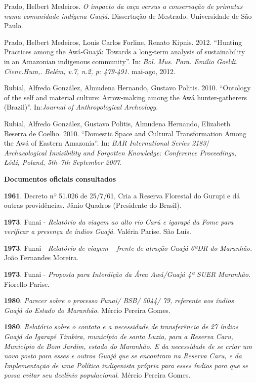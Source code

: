 Prado, Helbert Medeiros. \emph{O impacto da caça versus a conservação de
primatas numa comunidade indígena Guajá}. Dissertação de Mestrado.
Universidade de São Paulo.

Prado, Helbert Medeiros, Louis Carlos Forline, Renato Kipnis. 2012.
``Hunting Practices among the Awá-Guajá: Towards a long-term analysis of
sustainability in an Amazonian indigenous community''. In: \emph{Bol. Mus.
Para. Emilio Goeldi. Cienc.Hum,. Belém, v.7, n.2, p: 479-491}. mai-ago,
2012.

Rubial, Alfredo González, Almudena Hernando, Gustavo Politis. 2010.
``Ontology of the self and material culture: Arrow-making among the Awá
hunter-gatherers (Brazil)''. In:\emph{Journal of Anthropological
Archeology}.

Rubial, Alfredo González, Gustavo Politis, Almudena Hernando, Elizabeth
Beserra de Coelho. 2010. ``Domestic Space and Cultural Transformation
Among the Awá of Eastern Amazonia''. In: \emph{BAR International Series
2183}/ \emph{Archaeological Invisibility and Forgotten Knowledge:
Conference Proceedings, Łódź, Poland, 5th--7th September 2007}.

\textbf{Documentos oficiais consultados}

\textbf{1961}. Decreto nº 51.026 de 25/7/61, Cria a Reserva Florestal do
Gurupi e dá outras providências. Jânio Quadros (Presidente do Brasil).

\textbf{1973}. Funai - \emph{Relatório da viagem ao alto rio Carú e
igarapé da Fome para verificar a presença de índios Guajá}. Valéria
Parise. São Luís.

\textbf{1973}. Funai - \emph{Relatório de viagem -- frente de atração
Guajá 6ªDR do Maranhão}. João Fernandes Moreira.

\textbf{1973}. Funai - \emph{Proposta para Interdição da Área Awá/Guajá
4ª SUER Maranhão.} Fiorello Parise.

\textbf{1980}. \emph{Parecer sobre o processo Funai/ BSB/ 5044/ 79,
referente aos índios Guajá do Estado do Maranhão}. Mércio Pereira Gomes.

\textbf{1980}. \emph{Relatório sobre o contato e a necessidade de
transferência de 27 índios Guajá do Igarapé Timbira, município de santa
Luzia, para a Reserva Caru, Município de Bom Jardim, estado do Maranhão.
E da necessidade de se criar um novo posto para esses e outros Guajá que
se encontram na Reserva Caru, e da Implementação de uma Política
indigenista própria para esses índios para que se possa evitar seu
declínio populacional}. Mércio Pereira Gomes.

